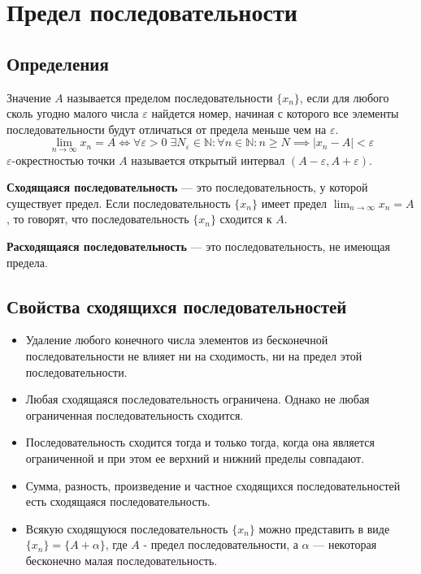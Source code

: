 \documentclass[a4paper,12pt,oneside]{extbook}
\theoremstyle{numbered}
\theoremstyle{unnumbered}
\theoremstyle{named}
\theoremstyle{unnumbered}
\theoremstyle{named}
\theoremstyle{named}
\theoremstyle{named}
\begin{document}
\section{Предел последовательности}%
\label{sec:Предел последовательности}

\subsection{Определения}%
\label{sub:Определения}

\begin{siderules}
    Значение \(A\) называется пределом последовательности \(\{x_n\}\), если для любого сколь угодно малого числа \(\varepsilon\) найдется номер, начиная с которого все элементы последовательности будут отличаться от предела меньше чем на \(\varepsilon\).
    \[
        \lim_{n \to \infty}{x_n} = A \iff
        \forall \varepsilon > 0 \; \exists N_{\varepsilon} \in \mathbb{N}: \forall n \in \mathbb{N}: n \geq N \implies |x_n - A| < \varepsilon
    \]
    \(\varepsilon\)-окрестностью точки \(A\) называется открытый интервал \((A - \varepsilon, A + \varepsilon)\).
\end{siderules}

\begin{siderules}
    \textbf{Сходящаяся последовательность} — это последовательность, у которой существует предел. Если последовательность \(\{x_n\}\) имеет предел \(\displaystyle \lim_{n \to \infty}{x_n} = A\), то говорят, что последовательность \(\{x_n\}\) сходится к \(A\).
\end{siderules}

\begin{siderules}
    \textbf{Расходящаяся последовательность} — это последовательность, не имеющая предела.
\end{siderules}

\subsection{Свойства сходящихся последовательностей}%
\label{sub:Свойства сходящихся последовательностей}

\begin{itemize}
    \item {Удаление любого конечного числа элементов из бесконечной последовательности не влияет ни на сходимость, ни на предел этой последовательности.}
    \item {Любая сходящаяся последовательность ограничена. Однако не любая ограниченная последовательность сходится.}
    \item {Последовательность сходится тогда и только тогда, когда она является ограниченной и при этом ее верхний и нижний пределы совпадают.}
    \item {Сумма, разность, произведение и частное сходящихся последовательностей есть сходящаяся последовательность.}
    \item {Всякую сходящуюся последовательность \(\{x_n\}\) можно представить в виде \(\{x_n\} = \{A + \alpha\}\), где \(A\) - предел последовательности, а \(\alpha\) — некоторая бесконечно малая последовательность.}
\end{itemize}
\end{document}
